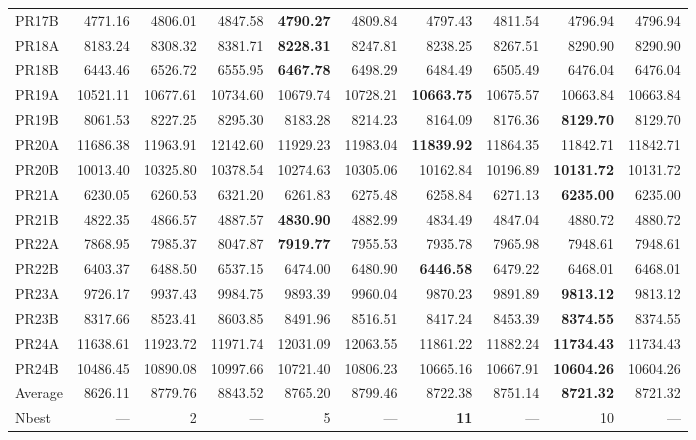 \documentclass{setp-new}
\begin{document}
\begin{table}[H]
\begin{tabular*}{\textwidth}{@{\extracolsep{\fill}}lrrrrrrrrr@{}}
    PR17B & 4771.16 & 4806.01 & 4847.58 & \textbf{4790.27} & 4809.84 & 4797.43 & 4811.54 & 4796.94 & 4796.94\\
    PR18A & 8183.24 & 8308.32 & 8381.71 & \textbf{8228.31} & 8247.81 & 8238.25 & 8267.51 & 8290.90 & 8290.90\\
    PR18B & 6443.46 & 6526.72 & 6555.95 & \textbf{6467.78} & 6498.29 & 6484.49 & 6505.49 & 6476.04 & 6476.04\\
    PR19A & 10521.11 & 10677.61 & 10734.60 & 10679.74 & 10728.21 & \textbf{10663.75} & 10675.57 & 10663.84 & 10663.84\\
    PR19B & 8061.53 & 8227.25 & 8295.30 & 8183.28 & 8214.23 & 8164.09 & 8176.36 & \textbf{8129.70} & 8129.70\\
    PR20A & 11686.38 & 11963.91 & 12142.60 & 11929.23 & 11983.04 & \textbf{11839.92} & 11864.35 & 11842.71 & 11842.71\\
    PR20B & 10013.40 & 10325.80 & 10378.54 & 10274.63 & 10305.06 & 10162.84 & 10196.89 & \textbf{10131.72} & 10131.72\\
    PR21A & 6230.05 & 6260.53 & 6321.20 & 6261.83 & 6275.48 & 6258.84 & 6271.13 & \textbf{6235.00} & 6235.00\\
    PR21B & 4822.35 & 4866.57 & 4887.57 & \textbf{4830.90} & 4882.99 & 4834.49 & 4847.04 & 4880.72 & 4880.72\\
    PR22A & 7868.95 & 7985.37 & 8047.87 & \textbf{7919.77} & 7955.53 & 7935.78 & 7965.98 & 7948.61 & 7948.61\\
    PR22B & 6403.37 & 6488.50 & 6537.15 & 6474.00 & 6480.90 & \textbf{6446.58} & 6479.22 & 6468.01 & 6468.01\\
    PR23A & 9726.17 & 9937.43 & 9984.75 & 9893.39 & 9960.04 & 9870.23 & 9891.89 & \textbf{9813.12} & 9813.12\\
    PR23B & 8317.66 & 8523.41 & 8603.85 & 8491.96 & 8516.51 & 8417.24 & 8453.39 & \textbf{8374.55} & 8374.55\\
    PR24A & 11638.61 & 11923.72 & 11971.74 & 12031.09 & 12063.55 & 11861.22 & 11882.24 & \textbf{11734.43} & 11734.43\\
    PR24B & 10486.45 & 10890.08 & 10997.66 & 10721.40 & 10806.23 & 10665.16 & 10667.91 & \textbf{10604.26} & 10604.26\\
    \midrule
    Average & 8626.11 & 8779.76 & 8843.52 & 8765.20 & 8799.46 & 8722.38 & 8751.14 & \textbf{8721.32} & 8721.32\\
    Nbest & --- & 2 & --- & 5 & --- & \textbf{11} & --- & 10 & ---\\
    \bottomrule
  \end{tabular*}
\end{table}
\end{document}
